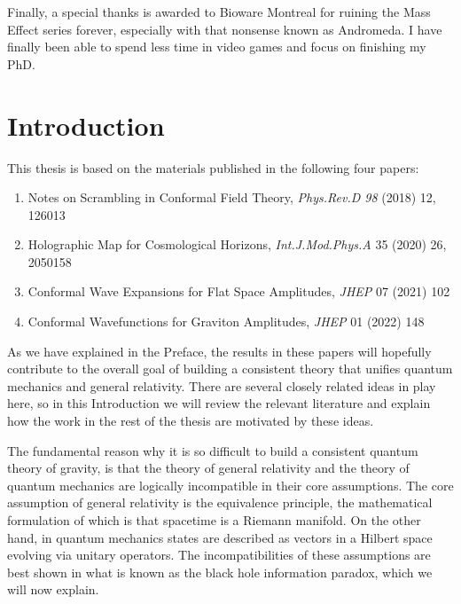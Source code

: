 \documentclass{brownthesis}
\begin{document}
Finally, a special thanks is awarded to Bioware Montreal for ruining the Mass Effect series forever, especially with that nonsense known as Andromeda. I have finally been able to spend less time in video games and focus on finishing my PhD.
\afterpreface

\chapter{Introduction}
This thesis is based on the materials published in the following four papers:
\begin{enumerate}
  \item{Notes on Scrambling in Conformal Field Theory, {\sl Phys.Rev.D 98} (2018) 12, 126013}
  \item{Holographic Map for Cosmological Horizons, {\sl Int.J.Mod.Phys.A} 35 (2020) 26, 2050158}
  \item{Conformal Wave Expansions for Flat Space Amplitudes, {\sl JHEP} 07 (2021) 102}
  \item{Conformal Wavefunctions for Graviton Amplitudes, {\sl JHEP} 01 (2022) 148}
\end{enumerate}
As we have explained in the Preface, the results in these papers will hopefully contribute to
the overall goal of building a consistent theory that unifies quantum mechanics and general
relativity. There are several closely related ideas in play here, so in this Introduction
we will review the relevant literature and explain how the work in the rest of the thesis
are motivated by these ideas.

The fundamental reason why it is so difficult to build a consistent quantum theory of
gravity, is that the theory of general relativity and the theory of quantum mechanics
are logically incompatible in their core assumptions. The core assumption of general relativity
is the equivalence principle, the mathematical formulation of which is that spacetime
is a Riemann manifold. On the other hand, in quantum mechanics states are described
as vectors in a Hilbert space evolving via unitary operators. The incompatibilities of these
assumptions are best shown in what is known as the black hole information paradox, which we will
now explain.
\end{document}
